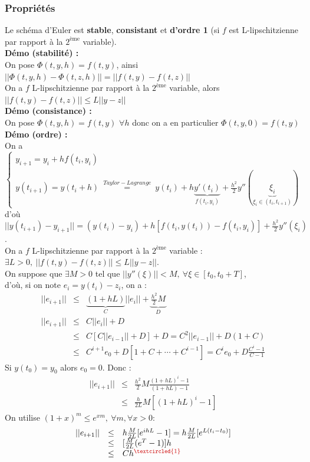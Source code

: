 \documentclass[a4paper,10pt]{report}
\begin{document}
\subsubsection{Propriétés}
\noindent Le schéma d'Euler est \textbf{stable}, \textbf{consistant} et \textbf{d'ordre 1} (si $f$ est L-lipschitzienne par rapport à la $2^{\text{ème}}$ variable).  \\

\textbf{Démo (stabilité) :}\\
\indent On pose $\Phi(t,y,h)=f(t,y)$, ainsi $||\Phi(t,y,h)-\Phi(t,z,h)|| = ||f(t,y)-f(t,z)||$\\
\indent On a $f$ L-lipschitzienne par rapport à la $2^{\text{ème}}$ variable, alors $||f(t,y)-f(t,z)||\leq L||y-z||$\\

\textbf{Démo (consistance) :}\\
\indent On pose $\Phi(t,y,h)=f(t,y)$ $\forall h$ donc on a en particulier $\Phi(t,y,0)=f(t,y)$\\

\textbf{Démo (ordre) :}\\
\indent On a $\left\{\begin{array}{l}y_{i+1}=y_i+hf(t_i,y_i)  \\
		y(t_{i+1})=y(t_i+h)\ \overset{Taylor-Lagrange}{=}\ y(t_i)+h\underbrace{y'(t_i)}_{f(t_i,y_i)}+\frac{h^2}{2}y''(\underbrace{\xi_i}			_{\xi_i\in(t_i,t_{i+1})})\end{array} \right.$\\
\indent d'où $||y(t_{i+1})-y_{i+1}||=(y(t_i)-y_i)+h[f(t_i,y(t_i))-f(t_i,y_i)]+\frac{h^2}{2}y''(\xi_i)$.\\
\indent On a $f$ L-lipschitzienne par rapport à la $2^{\text{ème}}$ variable : $\exists L>0,\ ||f(t,y)-f(t,z)||\leq L||y-z||$.\\
\indent On suppose que $\exists M>0$ tel que $||y''(\xi)||<M,\ \forall\xi\in[t_0,t_0+T]$,\\
\indent d'où, si on note $e_i=y(t_i)-z_i$, on a :
		$$\begin{array}{lll}
		||e_{i+1}||&\leq&\underbrace{(1+hL)}_{C}||e_i||+\underbrace{\frac{h^2}{2}M}_{D}\\
		||e_{i+1}||&\leq&C||e_i||+D\\
				   &\leq&C[C||e_{i-1}||+D]+D=C^2||e_{i-1}||+D(1+C)\\
		           &\leq&C^{i+1}e_0+D[1+C+\cdots+C^{i-1}]=C^ie_0+D\frac{C^i-1}{C-1}
		\end{array}$$
\indent Si $y(t_0)=y_0$ alors $e_0=0$. Donc :
		$$\begin{array}{lll}
		||e_{i+1}||&\leq&\frac{h^2}{2}M\frac{(1+hL)^i-1}{(1+hL)-1}\\
		           &\leq&\frac{h}{2L}M[(1+hL)^i-1]
		\end{array}$$
\indent On utilise $(1+x)^m\leq e^{xm},\ \forall m,\forall x>0$:
		$$\begin{array}{lll}
		||e_{i+1}||&\leq&h\frac{M}{2L}[e^{ihL}-1]=h\frac{M}{2L}[e^{L(t_i-t_0)}]\\
		           &\leq&[\frac{M}{2L}(e^T-1)]h\\
				   &\leq&Ch^{\textcolor{red}{\textcircled{\scriptsize 1}}}
		\end{array}$$
\end{document}
